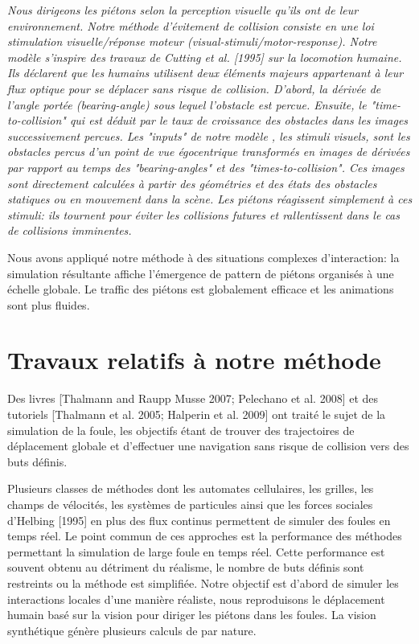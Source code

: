 \documentclass[11pt]{article}
\begin{document}
\textit{Nous dirigeons les piétons selon la perception visuelle qu'ils ont de leur environnement. Notre méthode d'évitement de collision consiste en une loi stimulation visuelle/réponse moteur (visual-stimuli/motor-response). Notre modèle s'inspire des travaux de Cutting et al. [1995] sur la locomotion humaine. Ils déclarent que les humains utilisent deux éléments majeurs appartenant à leur flux optique pour se déplacer sans risque de collision. D'abord, la dérivée de l'angle portée (bearing-angle) sous lequel l'obstacle est percue. Ensuite, le "time-to-collision" qui est déduit par le taux de croissance des obstacles dans les images successivement percues. Les "inputs" de notre modèle , les stimuli visuels, sont les obstacles percus d'un point de vue égocentrique transformés en images de dérivées par rapport au temps des "bearing-angles" et des "times-to-collision". Ces images sont directement calculées à partir des géométries et des états des obstacles statiques ou en mouvement dans la scène. Les piétons réagissent simplement à ces stimuli: ils tournent pour éviter les collisions futures et rallentissent dans le cas de collisions imminentes.}

Nous avons appliqué notre méthode à des situations complexes d'interaction: la simulation résultante affiche l'émergence de pattern de piétons organisés à une échelle globale. Le traffic des piétons est globalement efficace et les animations sont plus fluides. 

\section{Travaux relatifs à notre méthode}

Des livres\cite{thalmann-07} [Thalmann and Raupp Musse 2007; Pelechano et al. 2008] et des tutoriels\cite{thalmann-05} [Thalmann et al. 2005; Halperin et al. 2009] ont traité le sujet de la simulation de la foule, les objectifs étant de trouver des trajectoires de déplacement globale et d'effectuer une navigation sans risque de collision vers des buts définis.

Plusieurs classes de méthodes dont les automates cellulaires, les grilles, les champs de vélocités, les systèmes de particules ainsi que les forces sociales d'Helbing [1995] en plus des flux continus  permettent de simuler des foules en temps réel. Le point commun de ces approches est la performance des méthodes permettant la simulation de large foule en temps réel. Cette performance est souvent obtenu au détriment du réalisme, le nombre de buts définis sont restreints ou la méthode est simplifiée. Notre objectif est d'abord de simuler les interactions locales d'une manière réaliste, nous reproduisons le déplacement humain basé sur la vision pour diriger les piétons dans les foules. La vision synthétique génère plusieurs calculs de par nature.
\end{document}
